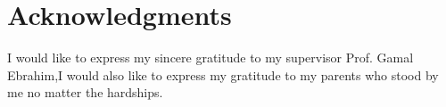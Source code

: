 \chapter*{Acknowledgments}
\label{chap:ack}
I would like to express my sincere gratitude to my supervisor Prof. Gamal Ebrahim,I would also
like to express my gratitude to my parents who stood by me no matter the hardships.
